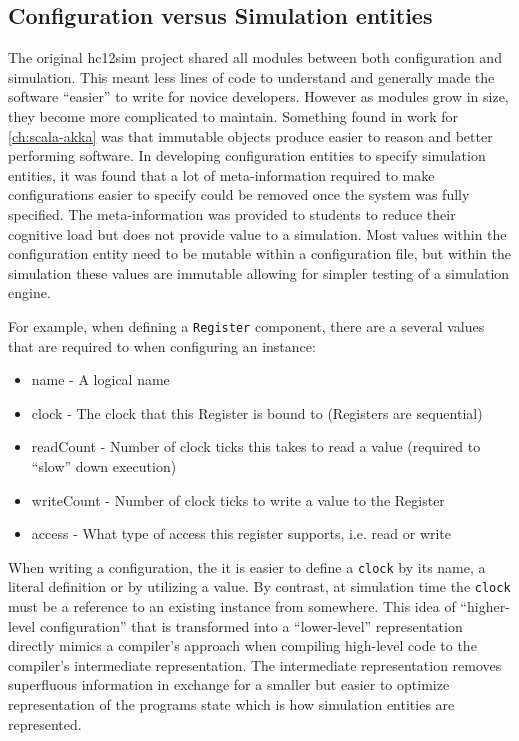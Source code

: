 \subsection{Configuration versus Simulation entities}

The original hc12sim project shared all modules between both configuration and simulation. This meant less lines of code to understand and generally made the software ``easier'' to write for novice developers. However as modules grow in size, they become more complicated to maintain. Something found in work for \cref{ch:scala-akka} was that immutable objects produce easier to reason and better performing software. In developing configuration entities to specify simulation entities, it was found that a lot of meta-information required to make configurations easier to specify could be removed once the system was fully specified. The meta-information was provided to students to reduce their cognitive load but does not provide value to a simulation. Most values within the configuration entity need to be mutable within a configuration file, but within the simulation these values are immutable allowing for simpler testing of a simulation engine.

For example, when defining a \texttt{Register} component, there are a several values that are required to when configuring an instance: 
\begin{itemize}
\item name - A logical name
\item clock - The clock that this Register is bound to (Registers are sequential)
\item readCount - Number of clock ticks this takes to read a value (required to ``slow'' down execution)
\item writeCount - Number of clock ticks to write a value to the Register
\item access - What type of access this register supports, i.e. read or write
\end{itemize}
When writing a configuration, the it is easier to define a \texttt{clock} by its name, a literal definition or by utilizing a  value. By contrast, at simulation time the \texttt{clock} must be a reference to an existing instance from somewhere. This idea of ``higher-level configuration'' that is transformed into a ``lower-level'' representation directly mimics a compiler's approach when compiling high-level code to the compiler's intermediate representation. The intermediate representation removes superfluous information in exchange for a smaller but easier to optimize representation of the programs state which is how simulation entities are represented.

